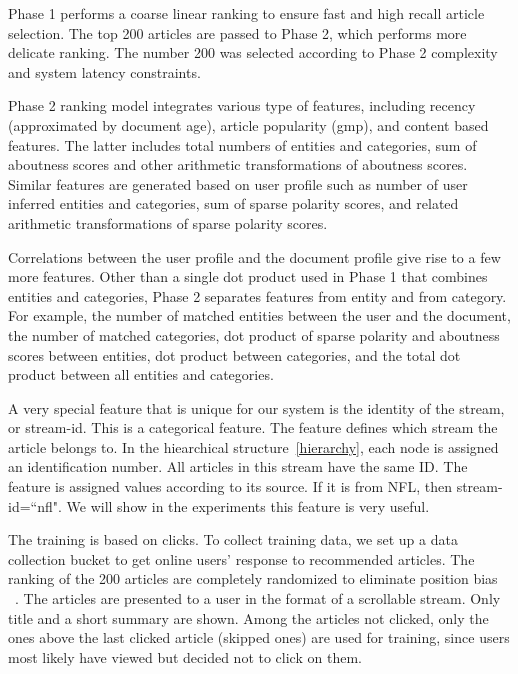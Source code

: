 


Phase 1 performs a coarse linear ranking to ensure fast and high recall 
article selection. The top 200 articles are passed
to Phase 2, which performs more delicate ranking. The number 200 was selected 
according to Phase 2 complexity and 
system latency constraints. 

Phase 2 ranking model integrates various type of features, including recency 
(approximated by document age), article popularity (gmp), and content based 
features. The latter includes total 
numbers of entities and categories, sum of aboutness scores and other 
arithmetic transformations of aboutness scores. Similar features are generated 
based on user profile such as number of user inferred entities and categories, 
sum of sparse polarity scores, and related arithmetic transformations of 
sparse polarity scores.

Correlations between the user profile and the document profile give rise to a 
few more features. Other than a single dot product used in Phase 1 that 
combines entities and categories, Phase 2 separates features from entity and 
from category. For example, the number of matched entities between the user 
and the document, the number of matched categories, dot product of sparse 
polarity and aboutness scores between entities, dot product between 
categories, and the total dot product between all entities and categories.

A very special feature that is unique for our system is the identity of the 
stream, or stream-id.  This is a categorical feature. The feature defines 
which stream the article belongs to. In the hiearchical 
structure~\ref{hierarchy}, each node is assigned an identification number. All 
articles in this stream have the same ID. The feature is assigned values 
according to its source. If it is from NFL, then stream-id=``nfl". We will 
show in the experiments this feature is very useful.  


The training is based on clicks. To collect training data, we set up a data 
collection bucket to get online users' response to recommended articles. The 
ranking of the 200 articles are completely randomized to eliminate position 
bias ~\cite{Li:2010:CAP:1772690.1772758}. The 
articles are presented to a user in the format of a scrollable stream. Only 
title and a short summary are shown. Among the articles not clicked, only the 
ones above the last clicked article (skipped ones) are used for training, 
since users most likely have viewed but decided not to click on them.

